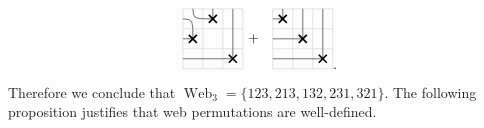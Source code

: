 \documentclass[reqno,12pt]{amsart}
\theoremstyle{definition}
\theoremstyle{remark}
\newcommand\Web{\operatorname{Web}}
\newcommand\Xmarking[2]
{\draw[very thick] (#1-0.7,#2-0.7)--(#1-0.3,#2-0.3);
\draw[very thick] (#1-0.7,#2-0.3)--(#1-0.3,#2-0.7);
\draw (#1-1,#2-0.5)--(#1-0.5,#2-0.5);
\draw (#1-0.5,#2-0.5)--(#1-0.5,#2); }
\newcommand\UP[2]{\draw (#1-0.5,#2)--(#1-0.5,#2-1);}
\newcommand\EAST[2]{\draw (#1,#2-0.5)--(#1-1,#2-0.5);}
\newcommand\Asmooth[2]
{\draw (#1,#2-0.5) .. controls (#1-0.45,#2-0.45) and (#1-0.45,#2-0.45) .. (#1-0.5,#2);
\draw (#1-1,#2-0.5) .. controls (#1-0.55,#2-0.55) and (#1-0.55,#2-0.55) .. (#1-0.5,#2-1); }
\begin{document}
\begin{align*}
\begin{tikzpicture}[scale=0.5]
        \draw[black!20] (0,0) grid (3,3);
        \Xmarking{1}{2}\Xmarking{2}{3}\Xmarking{3}{1}
        \Asmooth{1}{3}\EAST{2}{1}\EAST{1}{1}\UP{3}{3}\UP{3}{2}
    \end{tikzpicture}
        \begin{tikzpicture}[scale=0.5]
        \draw[white!20] (0,0) grid (1,3);
        \node[text width=0.5cm] at (0.5, 1.5) {$+$};
        \end{tikzpicture}
    \begin{tikzpicture}[scale=0.5]
        \draw[black!20] (0,0) grid (3,3);
        \Xmarking{1}{3}\Xmarking{2}{2}\Xmarking{3}{1}
        \UP{2}{3}\EAST{1}{2}\UP{3}{2}\UP{3}{3}\EAST{1}{1}\EAST{2}{1}
    \end{tikzpicture}.  
  \end{align*}
Therefore we conclude that $\Web_3=\{123, 213, 132, 231, 321\}$.
The following proposition justifies that web permutations are well-defined. 
\end{document}
